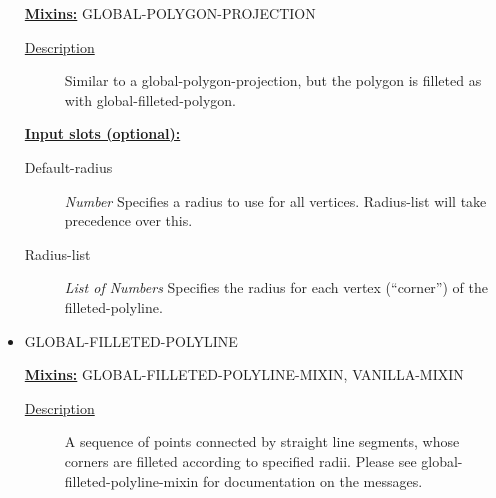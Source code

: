 \documentclass [11pt]{book}
\begin{document}
\begin{itemize}
\textbf{
\underline{Mixins:}} GLOBAL-POLYGON-PROJECTION





\begin{description}

\item [
\underline{Description}]


Similar to a global-polygon-projection, but the polygon is filleted
as with global-filleted-polygon.



\end{description}








\textbf{
\underline{Input slots (optional):}}

\begin{description}

\item [Default-radius]
\emph{Number} Specifies a radius to use for all vertices. Radius-list will take precedence over this.


\item [Radius-list]
\emph{List of Numbers} Specifies the radius for each vertex (``corner'') of the filleted-polyline.


\end{description}







\item {}GLOBAL-FILLETED-POLYLINE


\textbf{
\underline{Mixins:}} GLOBAL-FILLETED-POLYLINE-MIXIN, VANILLA-MIXIN





\begin{description}

\item [
\underline{Description}]


A sequence of points connected by straight line segments, whose
corners are filleted according to specified radii. Please see global-filleted-polyline-mixin
for documentation on the messages.



\end{description}










\end{itemize}
\end{document}
